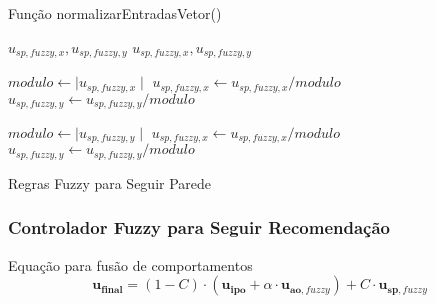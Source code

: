 \begin{frame}
	\begin{block}{Função normalizarEntradasVetor()}
		\begin{algorithm}[H]
			\scriptsize
			\caption{Normalização de Componentes do vetor}
			\begin{algorithmic}[1]
		
			\REQUIRE $u_{sp,\mathit{fuzzy}, x}, u_{sp,\mathit{fuzzy}, y}$
			\ENSURE $u_{sp,\mathit{fuzzy}, x}, u_{sp,\mathit{fuzzy}, y}$
			
			\STATE $modulo \leftarrow \mid u_{sp,\mathit{fuzzy}, x} \mid$
				\STATE $u_{sp,\mathit{fuzzy}, x} \leftarrow u_{sp,\mathit{fuzzy}, x}/modulo$
				\STATE $u_{sp,\mathit{fuzzy}, y} \leftarrow u_{sp,\mathit{fuzzy}, y}/modulo$
			\ENDIF
			
			\STATE $modulo \leftarrow \mid u_{sp,\mathit{fuzzy}, y} \mid$
				\STATE $u_{sp,\mathit{fuzzy}, x} \leftarrow u_{sp,\mathit{fuzzy}, x}/modulo$
				\STATE $u_{sp,\mathit{fuzzy}, y} \leftarrow u_{sp,\mathit{fuzzy}, y}/modulo$
			\ENDIF
		
			\end{algorithmic}
		\end{algorithm}
	\end{block}
\end{frame}

\begin{frame}
	\begin{block}{Regras Fuzzy para Seguir Parede}
		
	\end{block}
\end{frame}

\begin{frame}
	\frametitle{Controlador Fuzzy para Seguir Recomendação}
	\begin{exampleblock}{Equação para fusão de comportamentos}
		\begin{equation}
			\mathbf{u_{final}} = 
			(1 - C) \cdot (\mathbf{u_{ipo}} + \alpha \cdot \mathbf{u_{ao, \mathit{fuzzy}}})
			+ C \cdot \mathbf{u_{sp, \mathit{fuzzy}}}
		\end{equation}
	\end{exampleblock}
\end{frame}
	
\begin{frame}
	
\end{frame}

